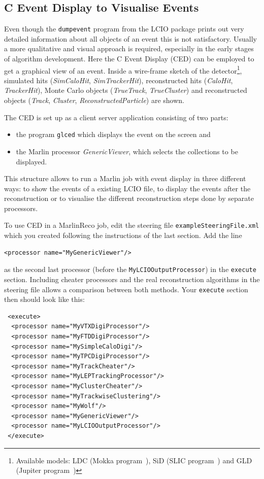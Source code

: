 \subsection{C Event Display to Visualise Events}

Even though the {\tt dumpevent} program from the LCIO package prints out
very detailed information about all objects of an event
this is not satisfactory. Usually a more qualitative and 
visual approach is required, especially in the early 
stages of algorithm development. Here the C Event Display (CED) can be 
employed to get a graphical view of an event. Inside a 
wire-frame sketch of the detector\footnote{
      Available models: LDC (Mokka program~\cite{ref_mokka}), 
      SiD (SLIC program~\cite{ref_slic}) and 
      GLD (Jupiter program~\cite{ref_jupiter})}, 
simulated hits ({\em SimCaloHit}, {\em SimTrackerHit}), reconstructed hits 
({\em CaloHit}, {\em TrackerHit}), Monte Carlo objects 
({\em TrueTrack}, {\em TrueCluster}) and reconstructed objects 
({\em Track}, {\em Cluster}, {\em ReconstructedParticle}) are shown. 

The CED is set up as a client server application consisting of two 
parts: 
\begin{itemize}
\item the program {\tt glced} which displays the event on the screen and 
\item the Marlin processor {\em GenericViewer}, which selects the collections 
      to be displayed.
\end{itemize}
This structure allows to run a Marlin job with event display in three
different ways: to show the events of a existing LCIO file, 
to display the events after the reconstruction or to visualise the 
different reconstruction steps done by separate processors. 

To use CED in a MarlinReco job, edit the steering file {\tt exampleSteeringFile.xml}
which you created following the instructions of the last section. 
Add the line 

\begin{verbatim}
<processor name="MyGenericViewer"/>
\end{verbatim}

as the second last processor (before the {\tt MyLCIOOutputProcessor})
in the {\tt execute} section. Including cheater processors and the
real reconstruction algorithms in the steering file allows a comparison 
between both methods. Your {\tt execute} section then should look like
this:

\begin{verbatim} 
 <execute>
  <processor name="MyVTXDigiProcessor"/>
  <processor name="MyFTDDigiProcessor"/>
  <processor name="MySimpleCaloDigi"/>
  <processor name="MyTPCDigiProcessor"/>
  <processor name="MyTrackCheater"/>
  <processor name="MyLEPTrackingProcessor"/>
  <processor name="MyClusterCheater"/>
  <processor name="MyTrackwiseClustering"/>
  <processor name="MyWolf"/>
  <processor name="MyGenericViewer"/>
  <processor name="MyLCIOOutputProcessor"/>
 </execute>
\end{verbatim}

